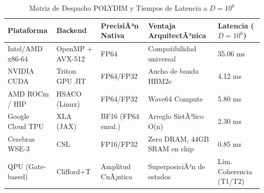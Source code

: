 \begin{table}[h]
\centering
\begin{tabular}{|l|l|l|l|l|}
\hline
\textbf{Plataforma} & \textbf{Backend} & \textbf{PrecisiÃ³n Nativa} & \textbf{Ventaja ArquitectÃ³nica} & \textbf{Latencia (\(D=10^6\))} \\ \hline
Intel/AMD x86-64    & OpenMP + AVX-512 & FP64                      & Compatibilidad universal        & 35.06 ms                      \\ \hline
NVIDIA CUDA         & Triton GPU JIT   & FP64/FP32                 & Ancho de banda HBM2e            & 4.12 ms                       \\ \hline
AMD ROCm / HIP      & HSACO (Linux)    & FP64/FP32                 & Wave64 Compute                  & 5.80 ms                       \\ \hline
Google Cloud TPU    & XLA (JAX)        & BF16 (FP64 emul.)         & Arreglo SistÃ³lico O(n)          & 2.30 ms                       \\ \hline
Cerebras WSE-3      & CSL              & FP16/FP32                 & Zero DRAM, 44GB SRAM en chip    & 0.85 ms                       \\ \hline
QPU (Gate-based)    & Clifford+T       & Amplitud CuÃ¡ntica         & SuperposiciÃ³n de estados        & Lim. Coherencia (T1/T2)       \\ \hline
\end{tabular}
\caption{Matriz de Despacho POLYDIM y Tiempos de Latencia a $D=10^6$}
\label{tab:dispatch_matrix}
\end{table}